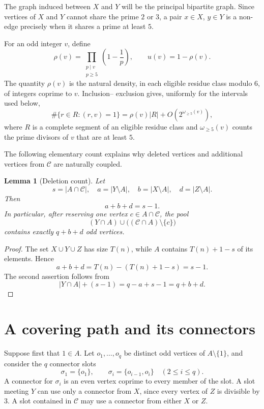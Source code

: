 \documentclass{article}
\newtheorem{lemma}[theorem]{Lemma}
\theoremstyle{remark}
\newcommand{\Ccal}{\mathcal{C}}
\begin{document}
The graph induced between \(X\) and \(Y\) will be the principal
bipartite graph. Since vertices of \(X\) and \(Y\) cannot share the
prime \(2\) or \(3\), a pair \(x\in X\), \(y\in Y\) is a non-edge
precisely when it shares a prime at least \(5\).

For an odd integer \(v\), define
\begin{equation}\label{eq:rho-def}
 \rho(v)=\prod_{\substack{p\mid v\\p\geq5}}
          \left(1-\frac1p\right),
 \qquad
 u(v)=1-\rho(v).
\end{equation}
The quantity \(\rho(v)\) is the natural density, in each eligible
residue class modulo \(6\), of integers coprime to \(v\). Inclusion--
exclusion gives, uniformly for the intervals used below,
\begin{equation}\label{eq:degree-asymp}
 \#\{r\in R:(r,v)=1\}
 =
 \rho(v)|R|+
 O\!\left(2^{\omega_{\geq5}(v)}\right),
\end{equation}
where \(R\) is a complete segment of an eligible residue class and
\(\omega_{\geq5}(v)\) counts the prime divisors of \(v\) that are at
least \(5\).

The following elementary count explains why deleted vertices and
additional vertices from \(\Ccal\) are naturally coupled.

\begin{lemma}[Deletion count]\label{lem:deletion}
Let
\[
 s=|A\cap\Ccal|,
 \quad
 a=|Y\setminus A|,
 \quad
 b=|X\setminus A|,
 \quad
 d=|Z\setminus A|.
\]
Then
\begin{equation}\label{eq:deletion}
 a+b+d=s-1.
\end{equation}
In particular, after reserving one vertex \(c\in A\cap\Ccal\), the pool
\[
 (Y\cap A)\cup\bigl((\Ccal\cap A)\setminus\{c\}\bigr)
\]
contains exactly \(q+b+d\) odd vertices.
\end{lemma}

\begin{proof}
The set \(X\cup Y\cup Z\) has size \(T(n)\), while \(A\) contains
\(T(n)+1-s\) of its elements. Hence
\[
 a+b+d=T(n)-(T(n)+1-s)=s-1.
\]
The second assertion follows from
\[
 |Y\cap A|+(s-1)=q-a+s-1=q+b+d.
\]
\end{proof}

\section{A covering path and its connectors}

Suppose first that \(1\in A\). Let \(o_1,\ldots,o_q\) be distinct odd
vertices of \(A\setminus\{1\}\), and consider the \(q\) connector slots
\[
 \sigma_1=\{o_1\},
 \qquad
 \sigma_i=\{o_{i-1},o_i\}\quad(2\leq i\leq q).
\]
A connector for \(\sigma_i\) is an even vertex coprime to every member
of the slot. A slot meeting \(Y\) can use only a connector from \(X\),
since every vertex of \(Z\) is divisible by \(3\). A slot contained in
\(\Ccal\) may use a connector from either \(X\) or \(Z\).
\end{document}
